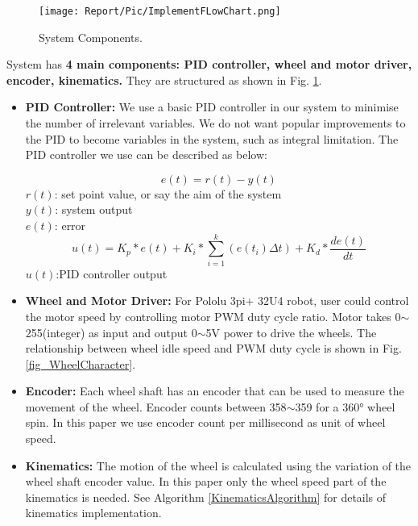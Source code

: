 \documentclass[conference]{IEEEtran}
\begin{document}
\begin{figure}[htbp]
\centerline{\texttt{[image: Report/Pic/ImplementFLowChart.png]}}
\caption{System Components.}
\label{fig_ImplementFlowChart}
\end{figure}

System has \textbf{4 main components: PID controller, wheel and motor driver, encoder, kinematics.} They are structured as shown in Fig. \ref{fig_ImplementFlowChart}. 
\begin{itemize}
    \item\textbf{PID Controller: } We use a basic PID controller in our system to minimise the number of irrelevant variables. We do not want popular improvements to the PID to become variables in the system, such as integral limitation. The PID controller we use can be described as below:
    
    
        \begin{equation}\label{PID_1}
            e(t) = r(t) - y(t)      
        \end{equation}
        $r(t)$: set point value, or say the aim of the system\\
        $y(t)$: system output \\
        $e(t)$: error
        \begin{equation}\label{PID_2}
            u(t)=K_{p}*e(t)+K_{i} * \sum_{i=1}^{k}  (e(t_{i})\Delta t)+K_{d} * \frac{de(t)}{dt}
        \end{equation}
        $u(t)$:PID controller output
        \par
    \item\textbf{Wheel and Motor Driver: }For Pololu 3pi+ 32U4 robot, user could control the motor speed by controlling motor PWM duty cycle ratio. Motor takes 0$\sim$255(integer) as input and output 0$\sim$5V power to drive the wheels. The relationship between wheel idle speed and PWM duty cycle is shown in Fig. \ref{fig_WheelCharacter}.
    \item\textbf{Encoder: }Each wheel shaft has an encoder that can be used to measure the movement of the wheel. Encoder counts between 358$\sim$359 for a 360° wheel spin. In this paper we use encoder count per millisecond as unit of wheel speed.
    \item\textbf{Kinematics: }The motion of the wheel is calculated using the variation of the wheel shaft encoder value. In this paper only the wheel speed part of the kinematics is needed. See Algorithm \ref{KinematicsAlgorithm} for details of kinematics implementation.
\end{itemize}
\end{document}
